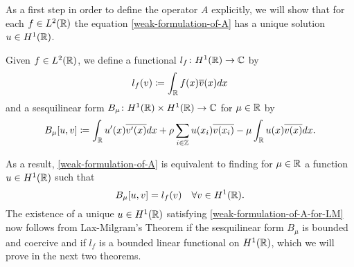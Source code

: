As a first step in order to define the operator $A$ explicitly, we will show that for each $f \in L^{2}(\mathbb{R})$ the equation \eqref{weak-formulation-of-A} has a unique solution $u \in H^{1}(\mathbb{R})$. 
\begin{definition}
	Given $f \in L^{2}(\mathbb{R})$, we define a functional $l_{f} \colon H^{1}(\mathbb{R}) \rightarrow \mathbb{C}$ by
	\[ l_{f}(v) \coloneqq \int_{\mathbb{R}} f(x) \overline{v}(x) dx \]
and a sesquilinear form $B_{\mu} \colon H^{1}(\mathbb{R}) \times H^{1}(\mathbb{R}) \rightarrow \mathbb{C}$ for $\mu \in \mathbb{R}$ by
	\[ B_{\mu}[u, v] \coloneqq \int_{\mathbb{R}} u'(x) \overline{v'(x)} dx + \rho \sum_{i \in \mathbb{Z}} u(x_{i}) \overline{v(x_{i})} - \mu \int_{\mathbb{R}} u(x) \overline{v(x)} dx. \]
\end{definition}
As a result, \eqref{weak-formulation-of-A} is equivalent to finding for $\mu \in \mathbb{R}$ a function $u \in H^{1}(\mathbb{R})$ such that
	\begin{equation}
		B_{\mu}[u, v] =  l_{f}(v) \quad \forall v \in H^{1}(\mathbb{R}). \label{weak-formulation-of-A-for-LM}
	\end{equation}
The existence of a unique $u \in H^{1}(\mathbb{R})$ satisfying \eqref{weak-formulation-of-A-for-LM} now follows from Lax-Milgram's Theorem if the sesquilinear form $B_{\mu}$ is bounded and coercive and if $l_{f}$ is a bounded linear functional on $H^{1}(\mathbb{R})$, which we will prove in the next two theorems.
